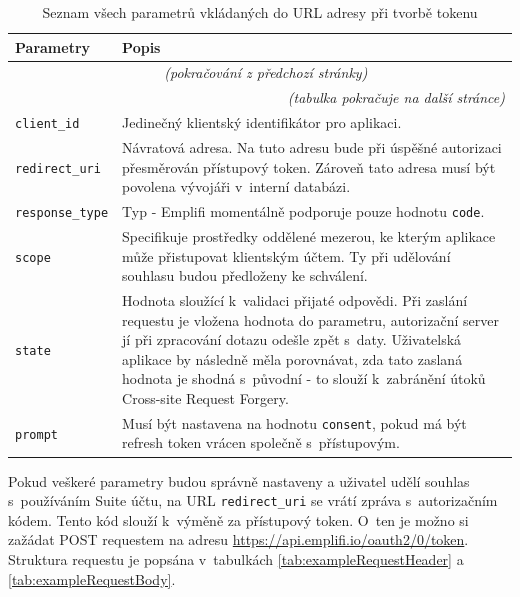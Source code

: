 \documentclass[czech, bc, kiv, he, iso690numb]{fasthesis}
\begin{document}
	\begin{longtable}{p{}p{}}
	\caption{Seznam všech parametrů vkládaných do URL adresy při tvorbě tokenu \cite{emplifiDocs}}
	\label{tab:allParametersAPI}\\
	\toprule[1.5pt]
	\textbf{Parametry} & \textbf{Popis}\\
	\midrule
	\endfirsthead
	\multicolumn{2}{c}{\tablename{}~\thetable{} \textit{(pokračování z předchozí stránky)}}\\
	\endhead
	\midrule
	\multicolumn{2}{r}{\textit{(tabulka pokračuje na další stránce)}}\\
	\endfoot
	\bottomrule[1.5pt]
	\endlastfoot
	\verb"client_id" &  Jedinečný klientský identifikátor pro aplikaci.\\
	\midrule
	\verb"redirect_uri" & Návratová adresa. Na tuto adresu bude při úspěšné autorizaci přesměrován přístupový token. Zároveň tato adresa musí být povolena vývojáři v~interní databázi.\\
	\midrule
	\verb"response_type" & Typ - Emplifi momentálně podporuje pouze hodnotu \texttt{code}.\\
	\midrule
	\verb"scope" & Specifikuje prostředky oddělené mezerou, ke kterým aplikace může přistupovat klientským účtem. Ty při udělování souhlasu budou předloženy ke schválení. \\
	\midrule
	\verb"state" & Hodnota sloužící k~validaci přijaté odpovědi. Při zaslání requestu je vložena hodnota do parametru, autorizační server jí při zpracování dotazu odešle zpět s~daty. Uživatelská aplikace by následně měla porovnávat, zda tato zaslaná hodnota je shodná s~původní - to slouží k~zabránění útoků Cross-site Request Forgery.\\
	\midrule
	\verb"prompt" & Musí být nastavena na hodnotu \texttt{consent}, pokud má být refresh token vrácen společně s~přístupovým.\\
	\end{longtable}

Pokud veškeré parametry budou správně nastaveny a uživatel udělí souhlas s~používáním Suite účtu, na URL \texttt{redirect\_uri} se vrátí zpráva s~autorizačním kódem. Tento kód
slouží k~výměně za přístupový token. O~ten je možno si zažádat POST requestem na adresu \url{https://api.emplifi.io/oauth2/0/token}. Struktura requestu je popsána v~tabulkách \ref{tab:exampleRequestHeader} a \ref{tab:exampleRequestBody}.
\end{document}
